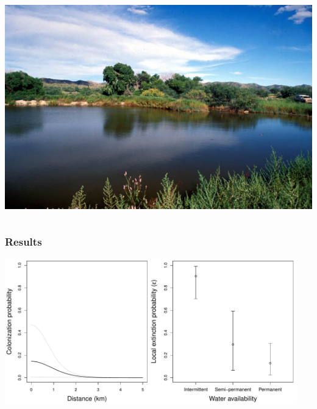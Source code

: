 \documentclass[color=usenames,dvipsnames]{beamer}\usepackage[]{graphicx}\usepackage[]{xcolor}
\begin{document}
\begin{frame}
\begin{columns}
\begin{column}{0.5\textwidth}
      \includegraphics[width=\textwidth]{figs/Carpenter}
    \end{column}
  \end{columns}
\end{frame}




\begin{frame}
  \frametitle{Results}
  \includegraphics[width=0.95\textwidth]{figs/col-ext} \\
\end{frame}
\end{document}
